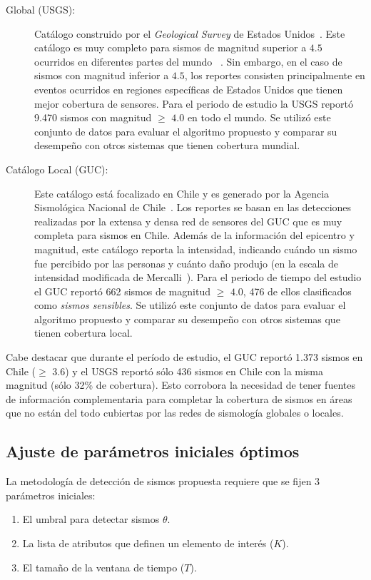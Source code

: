 \begin{description}
\item[Global (USGS):] 
		Catálogo construido por el \textit{Geological Survey} de Estados Unidos~\cite{usgs:data}. Este catálogo es muy completo para sismos de magnitud superior a $4.5$ ocurridos en diferentes partes del mundo ~\cite{earle2010omg}. Sin embargo, en el caso de sismos con magnitud inferior a $4.5$, los reportes consisten principalmente en eventos ocurridos en regiones específicas de Estados Unidos que tienen mejor cobertura de sensores. Para el periodo de estudio la USGS reportó 9.470 sismos con magnitud $\geq$ $4.0$ en todo el mundo. Se utilizó este conjunto de datos para evaluar el algoritmo propuesto y comparar su desempeño con otros sistemas que tienen cobertura mundial.

\item[Catálogo Local (GUC):]
		Este catálogo está focalizado en Chile y es generado por la Agencia Sismológica Nacional de Chile~\cite{guc:data}. Los reportes se basan en las detecciones realizadas por la extensa y densa red de sensores del GUC que es muy completa para sismos en Chile. Además de la información del epicentro y magnitud, este catálogo reporta la intensidad, indicando cuándo un sismo fue percibido por las personas y cuánto daño produjo (en la escala de intensidad modificada de Mercalli~\cite{usgs:mercalli}).
		Para el periodo de tiempo del estudio el GUC reportó 662 sismos de magnitud $\geq$ $4.0$, 476 de ellos clasificados como \textit{sismos sensibles}. Se utilizó este conjunto de datos para evaluar el algoritmo propuesto y comparar su desempeño con otros sistemas que tienen cobertura local. 
		
\end{description}
		
		Cabe destacar que durante el período de estudio, el GUC reportó 1.373 sismos en Chile ($\geq$ $3.6$) y el USGS reportó sólo 436 sismos en Chile con la misma magnitud (sólo 32\% de cobertura). Esto corrobora la necesidad de tener fuentes de información complementaria para completar la cobertura de sismos en áreas que no están del todo cubiertas por las redes de sismología globales o locales. 
		
	\subsection{Ajuste de parámetros iniciales óptimos}

	La metodología de detección de sismos propuesta requiere que se fijen 3 parámetros iniciales:
	\begin{enumerate}
		\item El umbral para detectar sismos $\theta$.
		\item La lista de atributos que definen un elemento de interés ($K$).
		\item El tamaño de la ventana de tiempo ($T$).
	\end{enumerate}
	
